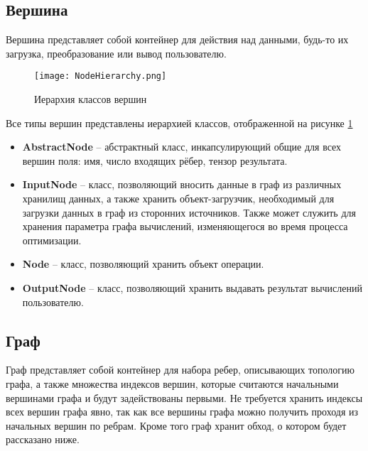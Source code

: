 \subsection{Вершина}
Вершина представляет собой контейнер для действия над данными, будь-то их загрузка, преобразование или вывод пользователю.
\begin{figure}[ht]
    \centering
    \texttt{[image: NodeHierarchy.png]}
    \caption{Иерархия классов вершин}
    \label{fig:nodes_hierarchy}
\end{figure}
Все типы вершин представлены иерархией классов, отображенной на рисунке \ref{fig:nodes_hierarchy}
\begin{itemize}
    \item \textbf{AbstractNode} -- абстрактный класс, инкапсулирующий общие для всех вершин поля: имя, число входящих рёбер, тензор результата.
    \item \textbf{InputNode} -- класс, позволяющий вносить данные в граф из различных хранилищ данных, а также хранить объект-загрузчик, необходимый для загрузки данных в граф из сторонних источников. Также может служить для хранения параметра графа вычислений, изменяющегося во время процесса оптимизации. 
    \item \textbf{Node} -- класс, позволяющий хранить объект операции.
    \item \textbf{OutputNode} -- класс, позволяющий хранить выдавать результат вычислений пользователю.
\end{itemize}

\subsection{Граф}
Граф представляет собой контейнер для набора ребер, описывающих топологию графа, а также множества индексов вершин, которые считаются начальными вершинами графа и будут задействованы первыми. Не требуется хранить индексы всех вершин графа явно, так как все вершины графа можно получить проходя из начальных вершин по ребрам. Кроме того граф хранит обход, о котором будет рассказано ниже.

